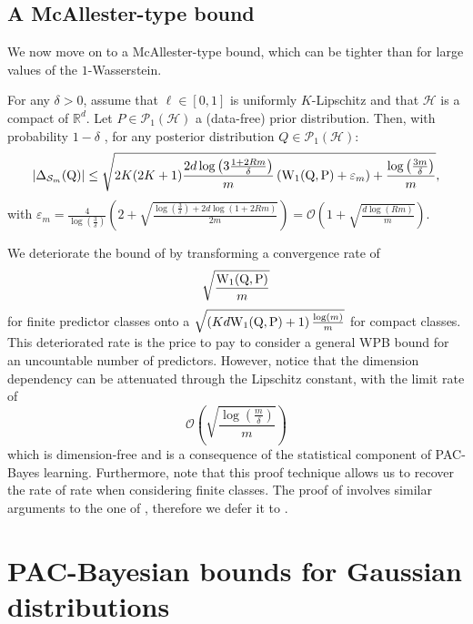 \subsection{A McAllester-type bound}
We now move on to a McAllester-type bound, which can be tighter than  for large values of the $1$-Wasserstein.

\begin{theorem}
\label{th: compact_mcall}
For any $\delta>0$, assume that $\ell\in[0,1]$ is uniformly $K$-Lipschitz and that $\mathcal{H}$ is a compact of $\mathbb{R}^d$. Let $P\in \mathcal{P}_1(\mathcal{H})$ a (data-free) prior distribution.
Then, with probability $1-\delta$ , for any posterior distribution $Q\in\mathcal{P}_1(\mathcal{H})$:
\[ |\Delta_{\mathcal{S}_m}(\mathrm{Q})| \leq \sqrt{2K(2K+1)\frac{2d\log\left(3\frac{1 +2Rm }{\delta}\right)}{m} \left(\mathrm{W}_{1}(\mathrm{Q},\mathrm{P})+\varepsilon_m  \right) + \frac{\log\left( \frac{3m}{\delta} \right)}{m}  }, \]
with $\varepsilon_m = \frac{4}{\log(\frac{3}{\delta})} \left( 2 + \sqrt{\frac{\log\left(\frac{3}{\delta}\right) + 2d\log(1+2Rm)}{2m}}  \right) = \mathcal{O}\left(1 + \sqrt{\frac{d\log(Rm)}{m}}\right)$.
\end{theorem}
We deteriorate the bound of \cite{amit2022integral} by transforming a convergence rate of $$\sqrt{\frac{\mathrm{W}_{1}(\mathrm{Q},\mathrm{P})}{m}}$$ for finite predictor classes onto a  $\sqrt{\left(Kd \mathrm{W}_{1}(\mathrm{Q},\mathrm{P})+1\right)\frac{\log(m)}{m}}$ for compact classes. This deteriorated rate is the price to pay to consider a general WPB bound for an uncountable number of predictors. However, notice that the dimension dependency can be attenuated through the Lipschitz constant, with the limit rate of $$\mathcal{O}\left(\sqrt{\frac{\log\left( \frac{m}{\delta} \right)}{m}}\right)$$ which is dimension-free and is a consequence of the statistical component of PAC-Bayes learning. Furthermore, note that this proof technique allows us to recover the rate of \citet{amit2022integral} rate when considering finite classes.
The proof of  involves similar arguments to the one of , therefore we defer it to .

\section{PAC-Bayesian bounds for Gaussian distributions}
\label{sec: wpb_gauss}

